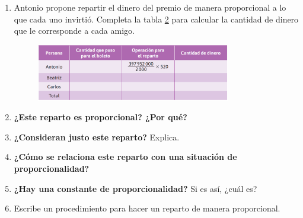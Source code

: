\documentclass[11pt]{book}
\begin{document}
\begin{enumerate}
\begin{enumerate}
\begin{figure}[H]
                  \label{tab:reparto_billetes}
                \end{figure}
          \item Antonio propone repartir el dinero del premio de manera proporcional a lo que cada uno invirtió.
                Completa la tabla \ref{tab:reparto_dinero} para calcular la cantidad de dinero que le corresponde a cada amigo.
                \begin{figure}[H]
                  \centering
                  \includegraphics[width=0.8\textwidth]{tabla2.18.png}
                  \label{tab:reparto_dinero}
                \end{figure}
          \item \textbf{¿Este reparto es proporcional? ¿Por qué?}\\[0.5cm]
          \item \textbf{¿Consideran justo este reparto?} Explica.\\[0.5cm]
          \item \textbf{¿Cómo se relaciona este reparto con una situación de proporcionalidad?}\\[0.5cm]
          \item \textbf{¿Hay una constante de proporcionalidad?} Si es así, ¿cuál es?\\[0.5cm]
          \item Escribe un procedimiento para hacer un reparto de manera proporcional.\\[0.5cm]
        \end{enumerate}
\end{enumerate}
\end{document}
